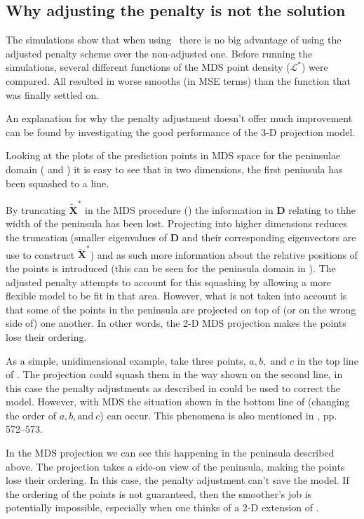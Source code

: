 \subsection{Why adjusting the penalty is not the solution}
\label{pensuck}

The simulations show that when using \mdsap\ there is no big advantage of using the adjusted penalty scheme over the non-adjusted one. Before running the simulations, several different functions of the MDS point density ($\mathcal{L}^*$) were compared. All resulted in worse smooths (in MSE terms) than the function that was finally settled on.

An explanation for why the penalty adjustment doesn't offer much improvement can be found by investigating the good performance of the 3-D projection model. 

Looking at the plots of the prediction points in MDS space for the peninsulae domain ( and ) it is easy to see that in two dimensions, the first peninsula has been squashed to a line. 

By truncating $\tilde{\mathbf{X}}^*$ in the MDS procedure () the information in $\mathbf{D}$ relating to thhe width of the peninsula has been lost. Projecting into higher dimensions reduces the truncation (smaller eigenvalues of $\mathbf{D}$ and their corresponding eigenvectors are use to construct $\tilde{\mathbf{X}}^*$) and as such more information about the relative positions of the points is introduced (this can be seen for the peninsula domain in ). The adjusted penalty attempts to account for this squashing by allowing a more flexible model to be fit in that area. However, what is not taken into account is that some of the points in the peninsula are projected on top of (or on the wrong side of) one another. In other words, the 2-D MDS projection makes the points lose their ordering. 

As a simple, unidimensional example, take three points, $a, b, \text{ and } c$ in the top line of . The projection could squash them in the way shown on the second line, in this case the penalty adjustments as described in  could be used to correct the model. However, with MDS the situation shown in the bottom line of  (changing the order of $a, b, \text{and}\ c$) can occur. This phenomena is also mentioned in \cite{elements}, pp. 572--573.

In the MDS projection we can see this happening in the peninsula described above. The projection takes a side-on view of the peninsula, making the points lose their ordering. In this case, the penalty adjustment can't save the model. If the ordering of the points is not guaranteed, then the smoother's job is potentially impossible, especially when one thinks of a 2-D extension of .

